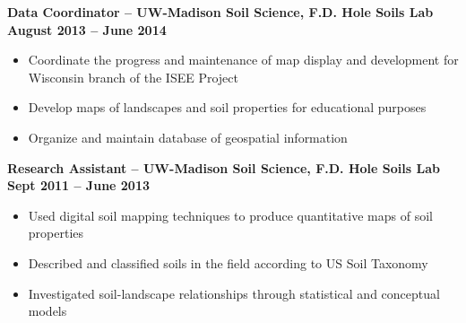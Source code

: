 \documentclass{article}
\begin{document}
\begin{small}
	\noindent \textbf{Data Coordinator -- UW-Madison Soil Science, F.D. Hole Soils Lab} \hfill \textbf{August 2013 -- June 2014}
	\begin{itemize}
		\item Coordinate the progress and maintenance of map display and development for Wisconsin branch of the ISEE Project
		\item Develop maps of landscapes and soil properties for educational purposes
		\item Organize and maintain database of geospatial information
	\end{itemize}
	\noindent \textbf{Research Assistant -- UW-Madison Soil Science, F.D. Hole Soils Lab} \hfill \textbf{Sept 2011 -- June 2013}
	\begin{itemize}
		\item Used digital soil mapping techniques to produce quantitative maps of soil properties
		\item Described and classified soils in the field according to US Soil Taxonomy
		\item Investigated soil-landscape relationships through statistical and conceptual models
	\end{itemize}

\end{small}
\end{document}
